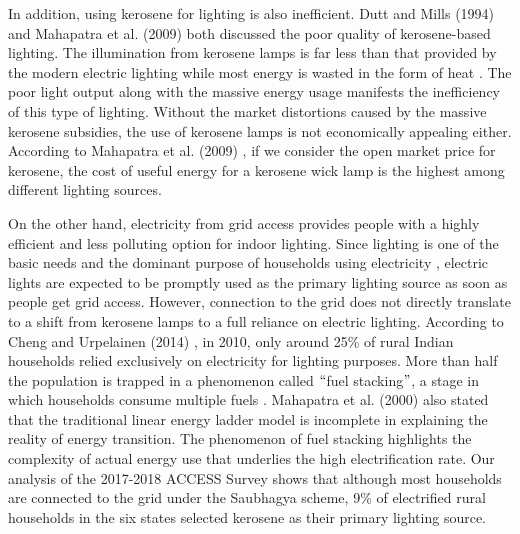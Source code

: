 \documentclass[11pt,english]{article}
\theoremstyle{plain} \newtheorem{claim}{Claim}
\theoremstyle{plain} \newtheorem{prop}{Proposition}
\theoremstyle{plain} \newtheorem{hypo}{Hypothesis}
\begin{document}
In addition, using kerosene for lighting is also inefficient. Dutt and Mills (1994) \citep{DuttMills1994} and Mahapatra et al. (2009) \citep{Mahapatraetal2009} both discussed the poor quality of kerosene-based lighting. The illumination from kerosene lamps is far less than that provided by the modern electric lighting while most energy is wasted in the form of heat \citep{Mills2005}. The poor light output along with the massive energy usage manifests the inefficiency of this type of lighting. Without the market distortions caused by the massive kerosene subsidies, the use of kerosene lamps is not economically appealing either. According to Mahapatra et al. (2009) \citep{Mahapatraetal2009}, if we consider the open market price for kerosene, the cost of useful energy for a kerosene wick lamp is the highest among different lighting sources.

On the other hand, electricity from grid access provides people with a highly efficient and less polluting option for indoor lighting. Since lighting is one of the basic needs and the dominant purpose of households using electricity \citep{Worldbank2008, Bernard2012}, electric lights are expected to be promptly used as the primary lighting source as soon as people get grid access. However, connection to the grid does not directly translate to a shift from kerosene lamps to a full reliance on electric lighting. According to Cheng and Urpelainen (2014) \citep{ChengUrpelainen2014}, in 2010, only around 25\% of rural Indian households relied exclusively on electricity for lighting purposes. More than half the population is trapped in a phenomenon called $``$fuel stacking$"$, a stage in which households consume multiple fuels \citep{ChengUrpelainen2014}. Mahapatra et al. (2000) \citep{Maseraetal2000} also stated that the traditional linear energy ladder model is incomplete in explaining the reality of energy transition. The phenomenon of fuel stacking highlights the complexity of actual energy use that underlies the high electrification rate. Our analysis of the 2017-2018 ACCESS Survey shows that although most households are connected to the grid under the Saubhagya scheme, 9\% of electrified rural households in the six states selected kerosene as their primary lighting source.
\end{document}
